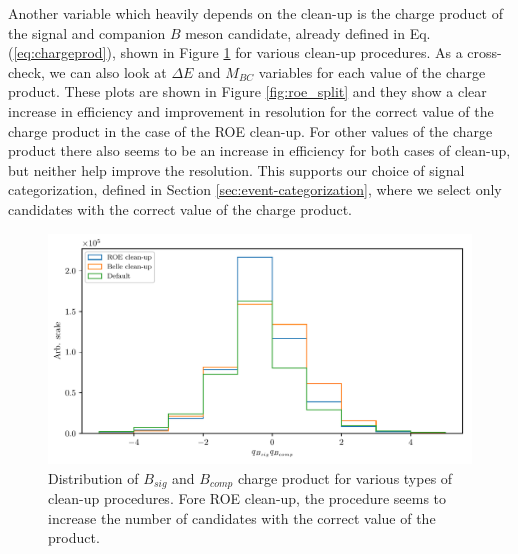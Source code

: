 \documentclass[oneside,a4paper,openany,12pt]{scrbook}
\begin{document}
Another variable which heavily depends on the clean-up is the charge product of the signal and companion $B$ meson candidate, already defined in Eq. (\ref{eq:chargeprod}), shown in Figure \ref{fig:roe_chargeproduct} for various clean-up procedures. As a cross-check, we can also look at $\Delta E$ and $M_{BC}$ variables for each value of the charge product. These plots are shown in Figure \ref{fig:roe_split} and they show a clear increase in efficiency and improvement in resolution for the correct value of the charge product in the case of the ROE clean-up. For other values of the charge product there also seems to be an increase in efficiency for both cases of clean-up, but neither help improve the resolution. This supports our choice of signal categorization, defined in Section \ref{sec:event-categorization}, where we select only candidates with the correct value of the charge product.

\begin{figure}[H]
\centering
\captionsetup{width=0.8\linewidth}
\includegraphics[width=\linewidth]{fig/roe_chargeprod}
\caption{Distribution of $B_{sig}$ and $B_{comp}$ charge product for various types of clean-up procedures. Fore ROE clean-up, the procedure seems to increase the number of candidates with the correct value of the product.}
\label{fig:roe_chargeproduct}
\end{figure}
\end{document}
